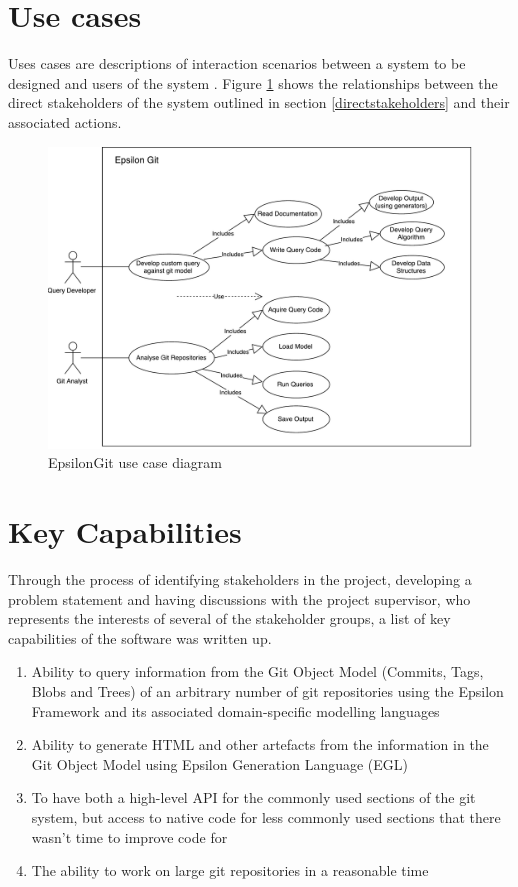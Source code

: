 \documentclass[11pt]{book}
\begin{document}
\section{Use cases}
Uses cases are descriptions of interaction scenarios between a system to be designed and users of the system \cite{usecase}. Figure \ref{fig:usecasediagram} shows the relationships between the direct stakeholders of the system outlined in section \ref{directstakeholders} and their associated actions.

\begin{figure}[h]
	\centering
	\includegraphics[width=\textwidth]{images/use-case-diagram}
	\caption{EpsilonGit use case diagram}
	\label{fig:usecasediagram}
\end{figure}

\section{Key Capabilities}
\label{keycapabilities}
Through the process of identifying stakeholders in the project, developing a problem statement and having discussions with the project supervisor, who represents the interests of several of the stakeholder groups, a list of key capabilities of the software was written up.

\begin{enumerate}
	\item Ability to query information from the Git Object Model (Commits, Tags, Blobs and Trees) of an arbitrary number of git repositories using the Epsilon Framework and its associated domain-specific modelling languages
	\item Ability to generate HTML and other artefacts from the information in the Git Object Model using Epsilon Generation Language (EGL)
	\item To have both a high-level API for the commonly used sections of the git system, but access to native code for less commonly used sections that there wasn't time to improve code for
	\item The ability to work on large git repositories in a reasonable time
\end{enumerate} 
\end{document}
